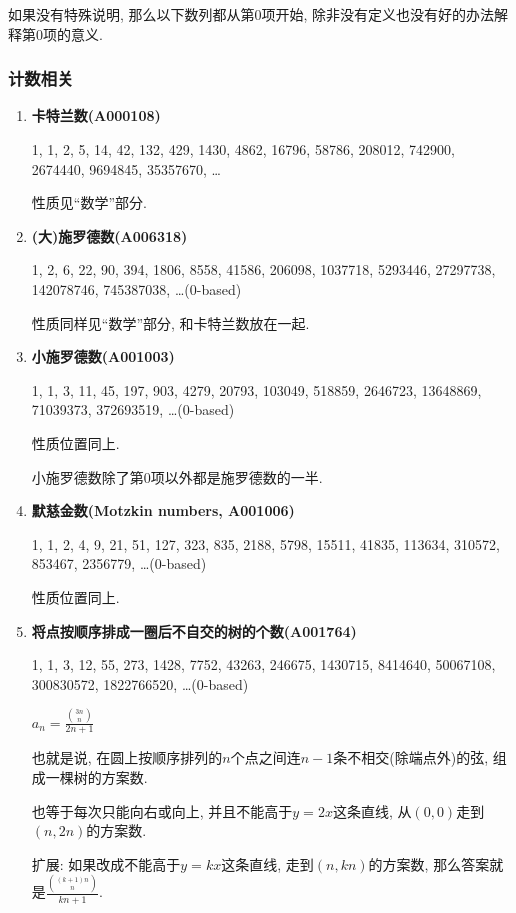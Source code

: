 如果没有特殊说明, 那么以下数列都从第$0$项开始, 除非没有定义也没有好的办法解释第$0$项的意义.

\subsubsection{计数相关}

\begin{enumerate}

\item \textbf{卡特兰数(A000108)}

1, 1, 2, 5, 14, 42, 132, 429, 1430, 4862, 16796, 58786, 208012, 742900, 2674440, 9694845, 35357670, \dots

性质见``数学''部分.

\item \textbf{(大)施罗德数(A006318)}

1, 2, 6, 22, 90, 394, 1806, 8558, 41586, 206098, 1037718, 5293446, 27297738, 142078746, 745387038, \dots \;(0-based)

性质同样见``数学''部分, 和卡特兰数放在一起.

\item \textbf{小施罗德数(A001003)}

1, 1, 3, 11, 45, 197, 903, 4279, 20793, 103049, 518859, 2646723, 13648869, 71039373, 372693519, \dots \;(0-based)

性质位置同上.

小施罗德数除了第$0$项以外都是施罗德数的一半.

\item \textbf{默慈金数(Motzkin numbers, A001006)}

1, 1, 2, 4, 9, 21, 51, 127, 323, 835, 2188, 5798, 15511, 41835, 113634, 310572, 853467, 2356779, \dots \;(0-based)

性质位置同上.

\item \textbf{将点按顺序排成一圈后不自交的树的个数(A001764)}

1, 1, 3, 12, 55, 273, 1428, 7752, 43263, 246675, 1430715, 8414640, 50067108, 300830572, 1822766520, \dots \;(0-based)

$ a_n = \frac {{3n \choose n}} {2n + 1} $

也就是说, 在圆上按顺序排列的$n$个点之间连$n - 1$条不相交(除端点外)的弦, 组成一棵树的方案数.

也等于每次只能向右或向上, 并且不能高于$y = 2x$这条直线, 从$(0, 0)$走到$(n, 2n)$的方案数.

扩展: 如果改成不能高于$y = kx$这条直线, 走到$(n, kn)$的方案数, 那么答案就是$ \frac {{(k + 1)n \choose n}} {kn + 1} $.


\end{enumerate}
